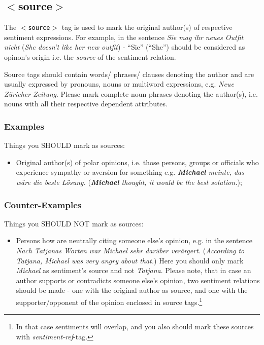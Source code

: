 \documentclass[11pt,a4paper]{article}
\newcommand{\xmltag}[1]{\textcolor{black}{{\small$<$#1$>$}}}
\begin{document}
\subsection{\xmltag{source}}
The \texttt{\xmltag{source}} tag is used to mark the original
author(s) of respective sentiment expressions. For example, in the
sentence \textit{Sie mag ihr neues Outfit nicht} (\textit{She doesn't
  like her new outfit}) - ``Sie'' (``She'') should be considered as
opinon's origin i.e. the \textit{source} of the sentiment relation.

Source tags should contain words/ phrases/ clauses denoting the author and are usually expressed by pronouns, nouns or multiword expressions,
e.g. \textit{Neue Z\"uricher Zeitung}. Please mark complete noun
phrases denoting the author(s), i.e. nouns with all their respective
dependent attributes.

\subsubsection{Examples}
Things you SHOULD mark as sources:
\begin{itemize}
  \item Original author(s) of polar opinions, i.e. those persons,
    groups or officials who experience sympathy or aversion for
    something e.g. \textit{\textbf{Michael} meinte, das w\"are die
      beste L\"osung.}  (\textit{\textbf{Michael} thought, it would be the
      best solution.});
\end{itemize}

\subsubsection{Counter-Examples}
Things you SHOULD NOT mark as sources:
\begin{itemize}
  \item Persons how are neutrally citing someone else's opinion,
    e.g. in the sentence \textit{Nach Tatjanas Worten war Michael sehr
      dar\"uber ver\"argert.} (\textit{According to Tatjana, Michael
      was very angry about that.}) Here you should only mark
    \textit{Michael} as sentiment's source and not \textit{Tatjana}. Please note, that in case an author
    supports or contradicts someone else's opinion, two sentiment
    relations should be made - one with the original author as source,
    and one with the supporter/opponent of the opinion enclosed in
    source tags.\footnote{In that case sentiments will overlap, and
      you also should mark these sources with \textit{sentiment-ref}-tag.}
\end{itemize}
\end{document}
